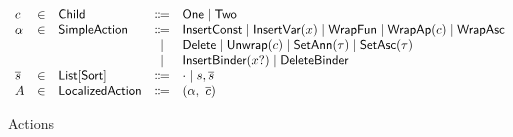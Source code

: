 \documentclass[acmsmall,dvipsnames,10pt,nonacm]{acmart}\settopmatter{printfolios=true} %
\newcommand{\TV}{\ensuremath{\tau}}
\newcommand{\VV}{\ensuremath{x}}
\newcommand{\BV}{\ensuremath{x?}}
\newcommand{\CV}{\ensuremath{c}}
\newcommand{\CName}{{\normalfont\textsf{Child}}}
\newcommand{\One}{{\normalfont\textsf{One}}}
\newcommand{\Two}{{\normalfont\textsf{Two}}}
\newcommand{\Three}{{\normalfont\textsf{Three}}}
\newcommand{\AV}{\ensuremath{\alpha}}
\newcommand{\AName}{{\normalfont\textsf{SimpleAction}}}
\newcommand{\LAV}{\ensuremath{A}}
\newcommand{\LAName}{{\normalfont\textsf{LocalizedAction}}}
\newcommand{\InsertConst}{{\normalfont\textsf{InsertConst}}}
\newcommand{\WrapFun}{{\normalfont\textsf{WrapFun}}}
\newcommand{\WrapAp}[1]{{\normalfont\textsf{WrapAp}}(#1)}
\newcommand{\InsertVar}[1]{{\normalfont\textsf{InsertVar}}(#1)}
\newcommand{\WrapAsc}{{\normalfont\textsf{WrapAsc}}}
\newcommand{\Delete}{{\normalfont\textsf{Delete}}}
\newcommand{\Unwrap}[1]{{\normalfont\textsf{Unwrap}}(#1)}
\newcommand{\SetAsc}[1]{{\normalfont\textsf{SetAsc}}(#1)}
\newcommand{\SetAnn}[1]{{\normalfont\textsf{SetAnn}}(#1)}
\newcommand{\InsertBinder}[1]{{\normalfont\textsf{InsertBinder}}(#1)}
\newcommand{\DeleteBinder}{{\normalfont\textsf{DeleteBinder}}}
\newcommand{\nil}{\cdot}
\newcommand{\cons}[2]{\ensuremath{#1,#2}}
\newcommand{\LA}[2]{\ensuremath{(#1,~#2)}}
\providecommand{\DIFaddbeginFL}{} %
\providecommand{\DIFaddendFL}{} %
\providecommand{\DIFdelbeginFL}{} %
\providecommand{\DIFdelendFL}{} %
\newcommand{\DIFscaledelfig}{0.5}
\newlength{\DIFdelgraphicswidth} %
\newlength{\DIFdelgraphicsheight} %
\newcommand{\DIFaddincludegraphics}[2][]{{\color{blue}\fbox{\DIFOincludegraphics[#1]{#2}}}} %
\newcommand{\DIFdelincludegraphics}[2][]{%
\sbox{\DIFdelgraphicsbox}{\DIFOincludegraphics[#1]{#2}}%
\settoboxwidth{\DIFdelgraphicswidth}{\DIFdelgraphicsbox} %
\settoboxtotalheight{\DIFdelgraphicsheight}{\DIFdelgraphicsbox} %
\scalebox{\DIFscaledelfig}{%
\parbox[b]{\DIFdelgraphicswidth}{\usebox{\DIFdelgraphicsbox}\\[-\baselineskip] \rule{\DIFdelgraphicswidth}{0em}}\llap{\resizebox{\DIFdelgraphicswidth}{\DIFdelgraphicsheight}{%
\setlength{\unitlength}{\DIFdelgraphicswidth}%
\begin{picture}(1,1)%
\thicklines\linethickness{2pt} %
{\color[rgb]{1,0,0}\put(0,0){\framebox(1,1){}}}%
{\color[rgb]{1,0,0}\put(0,0){\line( 1,1){1}}}%
{\color[rgb]{1,0,0}\put(0,1){\line(1,-1){1}}}%
\end{picture}%
}\hspace*{3pt}}} %
} %
\DeclareRobustCommand{\DIFaddbeginFL}{\DIFOaddbeginFL \let\includegraphics\DIFaddincludegraphics} %
\DeclareRobustCommand{\DIFaddendFL}{\DIFOaddendFL \let\includegraphics\DIFOincludegraphics} %
\DeclareRobustCommand{\DIFdelbeginFL}{\DIFOdelbeginFL \let\includegraphics\DIFdelincludegraphics} %
\DeclareRobustCommand{\DIFdelendFL}{\DIFOaddendFL \let\includegraphics\DIFOincludegraphics} %
\begin{document}
\begin{figure}
    \[\DIFdelbeginFL %
\DIFdelendFL \DIFaddbeginFL \begin{array}{lclcll}
    \CV & \in & \CName & \Coloneqq & \One \mid\Two \\
    \AV & \in & \AName & \Coloneqq & \InsertConst \mid \InsertVar{\VV} \mid \WrapFun \mid \WrapAp{\CV}\mid\WrapAsc\\
        &&&\mid &\Delete \mid \Unwrap{\CV}\mid \SetAnn{\TV} \mid \SetAsc{\TV}\\
        &&&\mid &\InsertBinder{\BV}\mid \DeleteBinder\\
    \overline{s} & \in & \mathsf{List[Sort]} & \Coloneqq & \nil \mid \cons{s}{\overline{s}}\\ 
    \LAV & \in & \LAName & \Coloneqq & \LA{\AV}{\overline{\CV}} 
    \end{array}\DIFaddendFL \]
    \vspace{-10pt}
    \caption{Actions}
    \label{fig:actions}
\end{figure}
\end{document}
